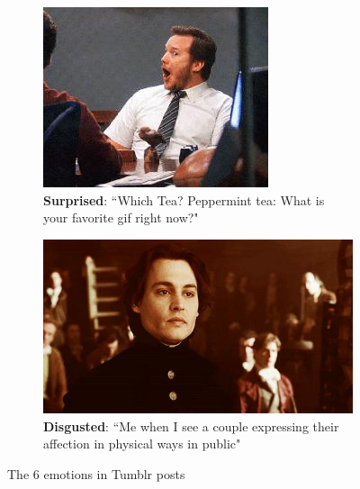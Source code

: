 \begin{figure}
\begin{subfigure}[t]{.5\textwidth}
  \includegraphics[width=.8\linewidth]{Images/surprised.jpg}
  \caption{\textbf{Surprised}: ``Which Tea? Peppermint tea: What is your favorite gif right now?"}
\end{subfigure}
\begin{subfigure}[t]{.5\textwidth}
  \vskip 0pt 
  \centering
  \includegraphics[width=.8\linewidth]{Images/disgusted.jpg}
  \caption{\textbf{Disgusted}: ``Me when I see a couple expressing their affection in physical ways in public"}
\end{subfigure}
\caption{The 6 emotions in Tumblr posts \cite{tumblr-photos}}
\end{figure}